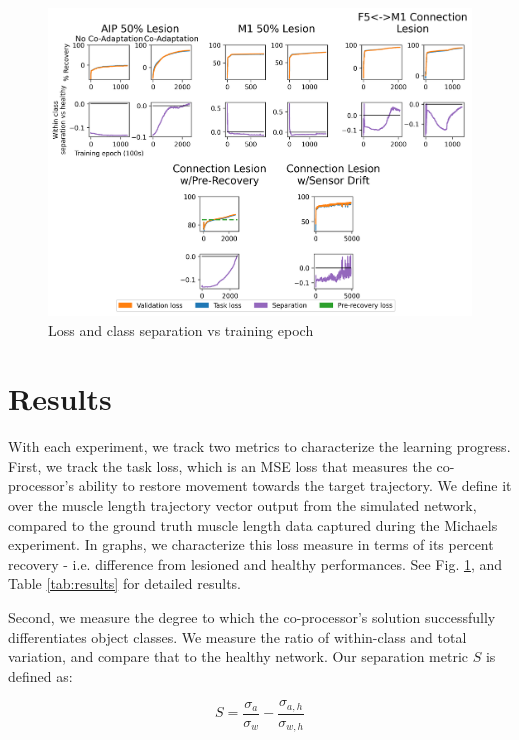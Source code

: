 \documentclass[12pt]{iopart}
\begin{document}
\begin{landscape}
\begin{figure}[hp]
\centering
\includegraphics[scale=1.0]{training_results.png}
\caption{Loss and class separation vs training epoch}
\label{fig:results}
\end{figure}
\end{landscape}

\section{Results}
\label{sec:results}

With each experiment, we track two metrics to characterize the learning progress. First, we
track the task loss, which is an MSE loss that measures the co-processor's ability to restore
movement towards the target trajectory. We define it over the muscle length trajectory vector
output from the simulated network, compared to the ground truth muscle length data captured
during the Michaels experiment. In graphs, we characterize this loss measure in terms of its
percent recovery - i.e. difference from lesioned and healthy performances. See Fig.
\ref{fig:results}, and Table \ref{tab:results} for detailed results.

Second, we measure the degree to which the co-processor's solution successfully
differentiates object classes. We measure the ratio of within-class and total variation,
and compare that to the healthy network. Our separation metric $S$ is defined as:

\begin{equation}
	S = \frac{\sigma_{a}}{\sigma_{w}} - \frac{\sigma_{a,h}}{\sigma_{w,h}}
\end{equation}
\end{document}
